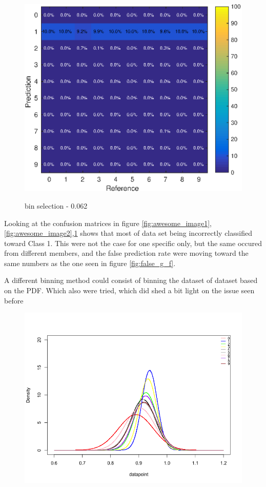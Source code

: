 \documentclass[10pt,a4paper]{article}
\begin{document}
\begin{figure}[!htb]
  \includegraphics[width=\linewidth]{confus_62.eps}
 \label{fig:awesome_image3}
 \caption{bin selection - 0.062}
\endminipage
\end{figure}

	
Looking at the confusion matrices  in figure \ref{fig:awesome_image1},\ref{fig:awesome_image2},\ref{fig:awesome_image3} shows that most of data set being incorrectly classified toward Class 1. 	This were not the case for one specific only, but the same occured from different members, and the false prediction rate were moving toward the same numbers as the one seen in figure \ref{fig:false_g_f}. 

A different binning method could consist of binning the dataset of dataset based on the PDF.
Which also were tried, which did shed a bit light on the issue seen before 

\begin{figure}[H]
\centering
\includegraphics[width =  \textwidth]{ndist_muld_class.png}
\end{figure} 
\end{document}
